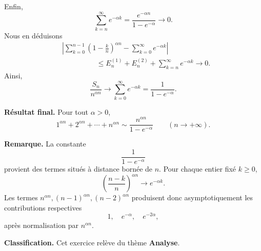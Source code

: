 \documentclass[11pt,a4paper]{article}
\begin{document}
\begin{preuvebox}
Enfin,
\[
\sum_{k=n}^{\infty}e^{-\alpha k}
=
\frac{e^{-\alpha n}}{1-e^{-\alpha}}
\longrightarrow0.
\]
Nous en d\'eduisons
\[
\begin{aligned}
&
\left|
\sum_{k=0}^{n-1}
\left(1-\frac{k}{n}\right)^{\alpha n}
-
\sum_{k=0}^{\infty}e^{-\alpha k}
\right|\\
&\hspace{2cm}
\leq
E_n^{(1)}+E_n^{(2)}
+\sum_{k=n}^{\infty}e^{-\alpha k}
\longrightarrow0.
\end{aligned}
\]
Ainsi,
\[
\frac{S_n}{n^{\alpha n}}
\longrightarrow
\sum_{k=0}^{\infty}e^{-\alpha k}
=
\frac{1}{1-e^{-\alpha}}.
\]
\end{preuvebox}

\begin{resultatbox}
\textbf{R\'esultat final.}
Pour tout \(\alpha>0\),
\[
\boxed{
1^{\alpha n}+2^{\alpha n}+\cdots+n^{\alpha n}
\sim
\frac{n^{\alpha n}}{1-e^{-\alpha}}
}
\qquad(n\longrightarrow+\infty).
\]
\end{resultatbox}

\begin{remarquebox}
\textbf{Remarque.}
La constante
\[
\frac{1}{1-e^{-\alpha}}
\]
provient des termes situ\'es \`a distance born\'ee de \(n\).
Pour chaque entier fix\'e \(k\geq0\),
\[
\left(\frac{n-k}{n}\right)^{\alpha n}
\longrightarrow e^{-\alpha k}.
\]
Les termes \(n^{\alpha n},(n-1)^{\alpha n},(n-2)^{\alpha n}\)
produisent donc asymptotiquement les contributions respectives
\[
1,\quad e^{-\alpha},\quad e^{-2\alpha},
\]
apr\`es normalisation par \(n^{\alpha n}\).
\end{remarquebox}

\begin{remarquebox}
\textbf{Classification.}
Cet exercice rel\`eve du th\`eme \textbf{Analyse}.
\end{remarquebox}
\end{document}
